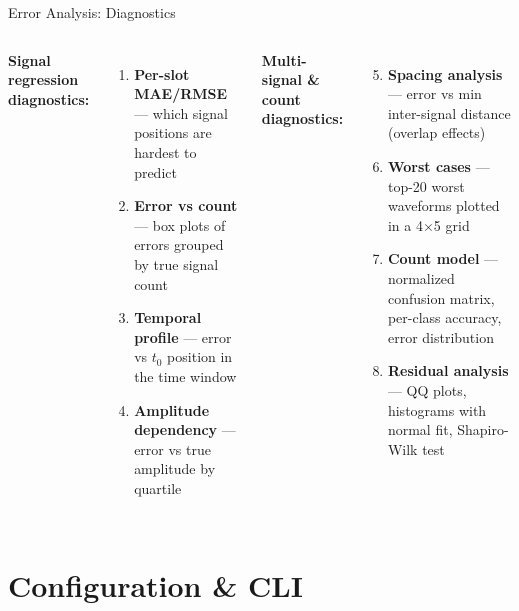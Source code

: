 \documentclass[aspectratio=169]{beamer}
\begin{document}
\begin{frame}{Error Analysis: Diagnostics}

\begin{columns}[T]
\textbf{Signal regression diagnostics:}
\begin{enumerate}
  \item \textbf{Per-slot MAE/RMSE} --- which signal positions are hardest to predict
  \item \textbf{Error vs count} --- box plots of errors grouped by true signal count
  \item \textbf{Temporal profile} --- error vs $t_0$ position in the time window
  \item \textbf{Amplitude dependency} --- error vs true amplitude by quartile
\end{enumerate}

\textbf{Multi-signal \& count diagnostics:}
\begin{enumerate}
  \setcounter{enumi}{4}
  \item \textbf{Spacing analysis} --- error vs min inter-signal distance (overlap effects)
  \item \textbf{Worst cases} --- top-20 worst waveforms plotted in a 4$\times$5 grid
  \item \textbf{Count model} --- normalized confusion matrix, per-class accuracy, error distribution
  \item \textbf{Residual analysis} --- QQ plots, histograms with normal fit, Shapiro-Wilk test
\end{enumerate}
\end{columns}
\end{frame}

\section{Configuration \& CLI}
\end{document}
